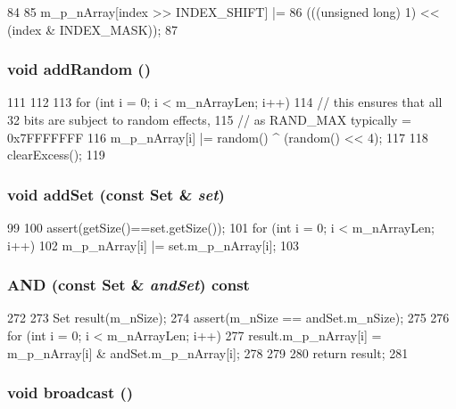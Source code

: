\begin{DoxyCode}
84     {
85         m_p_nArray[index >> INDEX_SHIFT] |=
86             (((unsigned long) 1) << (index & INDEX_MASK));
87     }
\end{DoxyCode}
\hypertarget{classSet_abd48774eca8e19eb2371c41bdf73c93c}{
\subsubsection[{addRandom}]{\setlength{\rightskip}{0pt plus 5cm}void addRandom ()}}
\label{classSet_abd48774eca8e19eb2371c41bdf73c93c}



\begin{DoxyCode}
111 {
112 
113     for (int i = 0; i < m_nArrayLen; i++) {
114         // this ensures that all 32 bits are subject to random effects,
115         // as RAND_MAX typically = 0x7FFFFFFF
116         m_p_nArray[i] |= random() ^ (random() << 4);
117     }
118     clearExcess();
119 }
\end{DoxyCode}
\hypertarget{classSet_a0412c72301eb345aceb1b0c2c38dd26a}{
\subsubsection[{addSet}]{\setlength{\rightskip}{0pt plus 5cm}void addSet (const {\bf Set} \& {\em set})}}
\label{classSet_a0412c72301eb345aceb1b0c2c38dd26a}



\begin{DoxyCode}
99 {
100     assert(getSize()==set.getSize());
101     for (int i = 0; i < m_nArrayLen; i++)
102         m_p_nArray[i] |= set.m_p_nArray[i];
103 }
\end{DoxyCode}
\hypertarget{classSet_a090263cd0c6181f2cb60641253dd6413}{
\subsubsection[{AND}]{ AND (const {\bf Set} \& {\em andSet}) const}}
\label{classSet_a090263cd0c6181f2cb60641253dd6413}



\begin{DoxyCode}
272 {
273     Set result(m_nSize);
274     assert(m_nSize == andSet.m_nSize);
275 
276     for (int i = 0; i < m_nArrayLen; i++) {
277         result.m_p_nArray[i] = m_p_nArray[i] & andSet.m_p_nArray[i];
278     }
279 
280     return result;
281 }
\end{DoxyCode}
\hypertarget{classSet_a299d89c50484c4d3a597f6b43b65e21c}{
\subsubsection[{broadcast}]{\setlength{\rightskip}{0pt plus 5cm}void broadcast ()}}
\label{classSet_a299d89c50484c4d3a597f6b43b65e21c}



